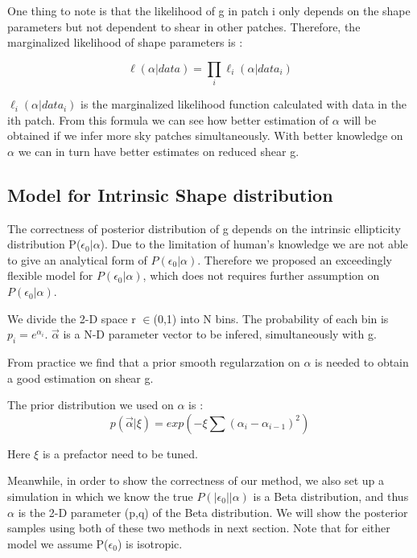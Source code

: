 \documentclass[useAMS,usenatbib]{mn2e}
\begin{document}
One thing to note is that the likelihood of g in patch i only depends
on the shape parameters but not dependent to shear in other patches. Therefore, the
marginalized likelihood of shape parameters is :

\begin{equation}
\ell(\alpha|data)=\prod_{i}\ell_{i}(\alpha|data_{i})
\end{equation}


$\ell_{i}(\alpha|data_{i})$ is the marginalized likelihood function
calculated with data in the ith patch. From this formula we can see
how better estimation of $\alpha$ will be obtained if we infer more
sky patches simultaneously. With better knowledge on $\alpha$ we
can in turn have better estimates on reduced shear g.


\subsection{Model for Intrinsic Shape distribution}

The correctness of posterior distribution of g depends on the intrinsic
ellipticity distribution P($\epsilon_{0}|\alpha$). Due to the limitation
of human's knowledge we are not able to give an analytical form of
$P(\epsilon_{0}|\alpha)$. Therefore we proposed an exceedingly flexible
model for $P(\epsilon_{0}|\alpha)$, which does not requires further
assumption on $P(\epsilon_{0}|\alpha)$.

We divide the 2-D space r $\in$(0,1) into N bins. The probability
of each bin is $p_{i}=e^{\alpha_{i}}$. $\overrightarrow{\alpha}$
is a N-D parameter vector to be infered, simultaneously with g.

From practice we find that a prior smooth regularzation on $\alpha$
is needed to obtain a good estimation on shear g.

The prior distribution we used on $\alpha$ is : 
\begin{equation}
p(\vec{\alpha}|\xi)=exp(-\xi\sum(\alpha_{i}-\alpha_{i-1})^{2})
\end{equation}


Here $\xi$ is a prefactor need to be tuned.

Meanwhile, in order to show the correctness of our method, we also
set up a simulation in which we know the true $P(|\epsilon_{0}||\alpha)$
is a Beta distribution, and thus $\alpha$ is the 2-D parameter (p,q)
of the Beta distribution. We will show the posterior samples using
both of these two methods in next section. Note that for either model
we assume P($\epsilon_{0}$) is isotropic.
\end{document}
